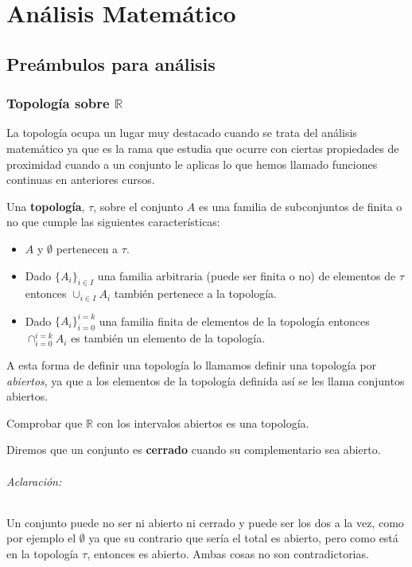 \part{Análisis Matemático}

\chapter{Preámbulos para análisis}
\minitoc

\newpage
\section{Topología sobre $\mathbb{R}$}
La topología ocupa un lugar muy destacado cuando se trata del análisis matemático ya que es la rama que estudia que ocurre con ciertas propiedades de proximidad cuando a un conjunto le aplicas lo que hemos llamado funciones continuas en anteriores cursos. 

\begin{defi}
Una \textbf{topología}, $\tau$, sobre el conjunto $A$  es una familia de subconjuntos de  finita o no que cumple las siguientes características:
\begin{itemize}
\item $A$ y $\emptyset$ pertenecen a $\tau$.
\item Dado $\lbrace A_i \rbrace_{i\in I}$ una familia arbitraria (puede ser finita o no) de elementos de $\tau$ entonces $\cup_{i\in I} A_i$ también pertenece a la topología.
\item Dado $\lbrace A_i \rbrace_{i=0}^{i=k}$ una familia finita de elementos de la topología entonces $\cap_{i=0}^{i=k} A_i$ es también un elemento de la topología.
\end{itemize}

A esta forma de definir una topología lo llamamos definir una topología por \emph{abiertos}, ya que a los elementos de la topología definida así se les llama conjuntos abiertos. 
\end{defi}
\begin{ejercicio}
Comprobar que $\mathbb{R}$ con los intervalos abiertos es una topología. 
\end{ejercicio}

\begin{defi}
Diremos que un conjunto es \textbf{cerrado} cuando su complementario sea abierto. 
\end{defi}

\paragraph*{Aclaración: } Un conjunto puede no ser ni abierto ni cerrado y puede ser los dos a la vez, como por ejemplo el $\emptyset$ ya que su contrario que sería el total es abierto, pero como está en la topología $\tau$, entonces es abierto. Ambas cosas no son contradictorias. 

